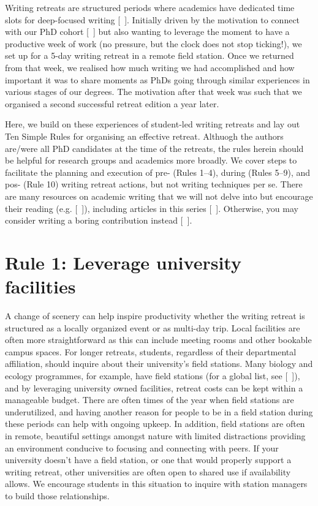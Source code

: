 \documentclass[10pt,letterpaper]{article}
\begin{document}
Writing retreats are structured periods where academics have dedicated time slots for deep-focused writing [~\cite{mcgrail2006, murray2009}]. Initially driven by the motivation to connect with our PhD cohort [~\cite{bernery, omeara}] but also wanting to leverage the moment to have a productive week of work (no pressure, but the clock does not stop ticking!), we set up for a 5-day writing retreat in a remote field station. Once we returned from that week, we realised how much writing we had accomplished and how important it was to share moments as PhDs going through similar experiences in various stages of our degrees. The motivation after that week was such that we organised a second successful retreat edition a year later.

Here, we build on these experiences of student-led writing retreats and lay out Ten Simple Rules for organising an effective retreat. Althuogh the authors are/were all PhD candidates at the time of the retreats, the rules herein should be helpful for research groups and academics more broadly. We cover steps to facilitate the planning and execution of pre- (Rules 1--4), during (Rules 5--9), and pos- (Rule 10) writing retreat actions, but not writing techniques per se. There are many resources on academic writing that we will not delve into but encourage their reading (e.g. [~\cite{turbek2016, hotaling2020, carter2020, cargill2021}]), including articles in this series [~\cite{weinberger2015, mensh2017, peterson2018}]. Otherwise, you may consider writing a boring contribution instead [~\cite{sand2007}].

\section*{Rule 1: Leverage university facilities}

A change of scenery can help inspire productivity whether the writing retreat is structured as a locally organized event or as multi-day trip. Local facilities are often more straightforward as this can include meeting rooms and other bookable campus spaces. For longer retreats, students, regardless of their departmental affiliation, should inquire about their university’s field stations. Many biology and ecology programmes, for example, have field stations (for a global list, see [~\cite{tydecks}]), and by leveraging university owned facilities, retreat costs can be kept within a manageable budget. There are often times of the year when field stations are underutilized, and having another reason for people to be in a field station during these periods can help with ongoing upkeep. In addition, field stations are often in remote, beautiful settings amongst nature with limited distractions providing an environment conducive to focusing and connecting with peers. If your university doesn’t have a field station, or one that would properly support a writing retreat, other universities are often open to shared use if availability allows. We encourage students in this situation to inquire with station managers to build those relationships.
\end{document}
